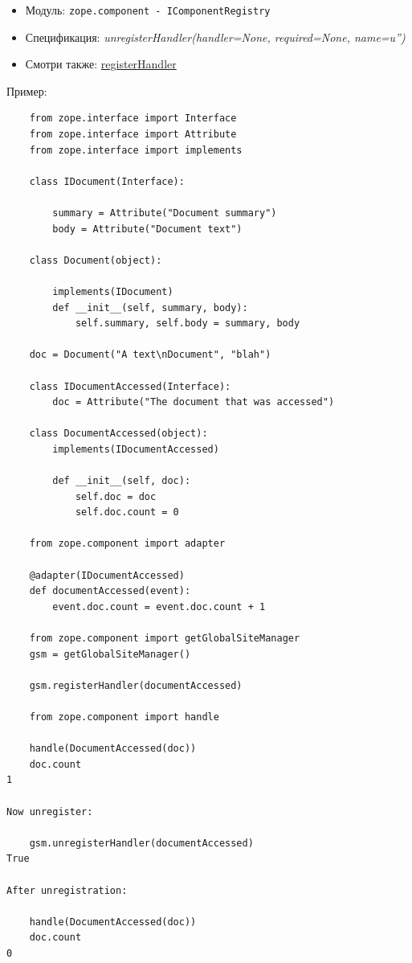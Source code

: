 \documentclass[a4paper,openany,twoside,final]{book}
\providecommand*{\DUroletitlereference}[1]{\textsl{#1}}
\begin{document}
\begin{itemize}

\item Модуль: \texttt{zope.component - IComponentRegistry}

\item Спецификация: \DUroletitlereference{unregisterHandler(handler=None, required=None, name=u'')}

\item Смотри также: \hyperref[registerhandler]{registerHandler}

\end{itemize}

Пример:

\begin{verbatim}
    from zope.interface import Interface
    from zope.interface import Attribute
    from zope.interface import implements

    class IDocument(Interface):

        summary = Attribute("Document summary")
        body = Attribute("Document text")

    class Document(object):

        implements(IDocument)
        def __init__(self, summary, body):
            self.summary, self.body = summary, body

    doc = Document("A text\nDocument", "blah")

    class IDocumentAccessed(Interface):
        doc = Attribute("The document that was accessed")

    class DocumentAccessed(object):
        implements(IDocumentAccessed)

        def __init__(self, doc):
            self.doc = doc
            self.doc.count = 0

    from zope.component import adapter

    @adapter(IDocumentAccessed)
    def documentAccessed(event):
        event.doc.count = event.doc.count + 1

    from zope.component import getGlobalSiteManager
    gsm = getGlobalSiteManager()

    gsm.registerHandler(documentAccessed)

    from zope.component import handle

    handle(DocumentAccessed(doc))
    doc.count
1

Now unregister:

    gsm.unregisterHandler(documentAccessed)
True

After unregistration:

    handle(DocumentAccessed(doc))
    doc.count
0
\end{verbatim}
\end{document}
